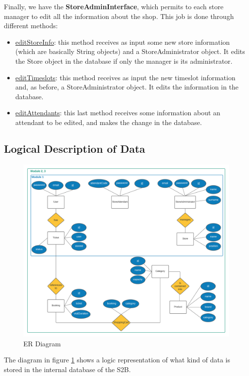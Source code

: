 \documentclass[table, 12pt]{article}
\begin{document}
Finally, we have the \textbf{StoreAdminInterface}, which permits to each store manager to edit all the information about the shop. This job is done through different methods:
\begin{itemize}
    \item \underline{editStoreInfo}: this method receives as input some new store information (which are basically String objects) and a StoreAdministrator object. It edits the Store object in the database if only the manager is its administrator.
    \item \underline{editTimeslots}: this method receives as input the new timeslot information and, as before, a StoreAdministrator object. It edits the information in the database.
    \item \underline{editAttendants}: this last method receives some information about an attendant to be edited, and makes the change in the database.
\end{itemize}

\subsection{Logical Description of Data}
\begin{figure}[H]
    \begin{center}
        \includegraphics[width=\textwidth]{assets/Architectural-Design/ER.png}
        \caption{ER Diagram}
        \label{er_diagram}
    \end{center}
\end{figure}
The diagram in figure \ref{er_diagram} shows a logic representation of what kind of data is stored in the internal database of the S2B.
\end{document}
